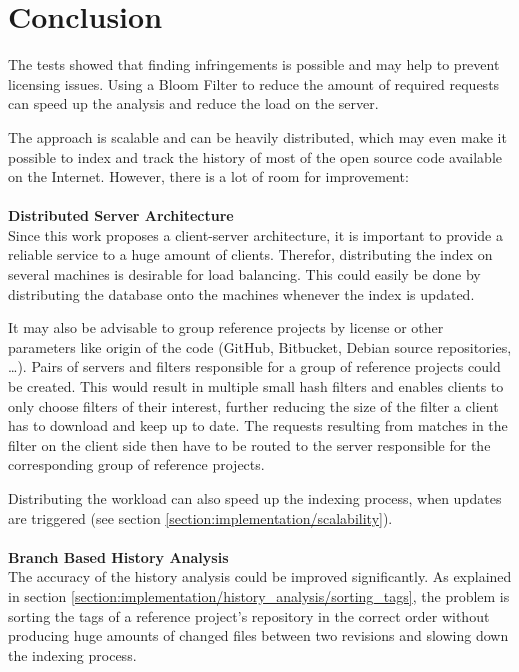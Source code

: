 
\chapter{Conclusion}\label{chapter:conclusion}
The tests showed that finding infringements is possible and may help to prevent licensing issues.
Using a Bloom Filter to reduce the amount of required requests can speed up the analysis and reduce the load on the server.

The approach is scalable and can be heavily distributed, which may even make it possible to index and track the history of most of the open source code available on the Internet.
However, there is a lot of room for improvement:\\
\\
\textbf{Distributed Server Architecture}\\
Since this work proposes a client-server architecture, it is important to provide a reliable service to a huge amount of clients.
Therefor, distributing the index on several machines is desirable for load balancing.
This could easily be done by distributing the database onto the machines whenever the index is updated.

It may also be advisable to group reference projects by license or other parameters like origin of the code (GitHub, Bitbucket, Debian source repositories, \dots).
Pairs of servers and filters responsible for a group of reference projects could be created.
This would result in multiple small hash filters and enables clients to only choose filters of their interest, further reducing the size of the filter a client has to download and keep up to date.
The requests resulting from matches in the filter on the client side then have to be routed to the server responsible for the corresponding group of reference projects.

Distributing the workload can also speed up the indexing process, when updates are triggered (see section \ref{section:implementation/scalability}).\\
\\
\textbf{Branch Based History Analysis}\\
The accuracy of the history analysis could be improved significantly.
As explained in section \ref{section:implementation/history_analysis/sorting_tags}, the problem is sorting the tags of a reference project's repository in the correct order without producing huge amounts of changed files between two revisions and slowing down the indexing process.


